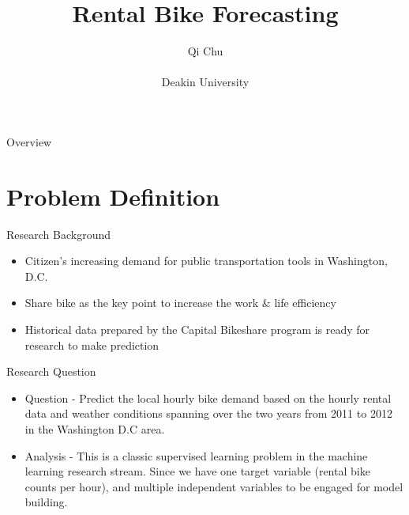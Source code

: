 \documentclass[
 size=14pt,
 paper=smartboard,  %
 mode=present, 		%
 display=slides, 	%
 style=tuliplab,  	%
 pauseslide,
 fleqn,leqno]{powerdot}
\title{Rental Bike Forecasting}
\author{
Qi Chu
\\
\\Deakin University
}
\date{\gitCommitterDate}
\begin{document}
\maketitle



\begin{slide}[toc=,bm=]{Overview}
\tableofcontents[content=currentsection,type=1]
\end{slide}


\section{Problem Definition}


\begin{slide}{Research Background}
\begin{center}
    \begin{itemize}
        \item Citizen's increasing demand for public transportation tools in Washington, D.C.
        \item Share bike as the key point to increase the work \& life efficiency
        \item Historical data prepared by the Capital Bikeshare program is ready for research to make prediction
    \end{itemize}
\end{center}
\bigskip

\end{slide}


\begin{slide}{{Research Question}}
\begin{center}
    \begin{itemize}
    \item Question - Predict the local hourly bike demand based on the hourly rental data and weather conditions spanning over the two years from 2011 to 2012 in the Washington D.C area.
    \item Analysis - This is a classic supervised learning problem in the machine learning research stream. Since we have one target variable (rental bike counts per hour), and multiple independent variables to be engaged for model building.
    \end{itemize}
\end{center}
\bigskip

\end{slide}
\end{document}
